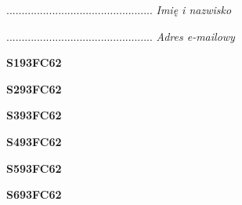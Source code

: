 \begin{turn}{90}\begin{minipage}{\linewidth} \vspace{20mm} ................................................  \textit{Imię i nazwisko}\end{minipage}\end{turn}

\begin{turn}{90}\begin{minipage}{\linewidth} \vspace{20mm} ................................................  \textit{Adres e-mailowy}\end{minipage}\end{turn}

\begin{turn}{90}\huge \begin{minipage}{\linewidth} \vspace{10mm}\textbf{S193FC62}\end{minipage}\end{turn}

\begin{turn}{90}\huge \begin{minipage}{\linewidth} \vspace{10mm}\textbf{S293FC62}\end{minipage}\end{turn}

\begin{turn}{90}\huge \begin{minipage}{\linewidth} \vspace{10mm}\textbf{S393FC62}\end{minipage}\end{turn}

\begin{turn}{90}\huge \begin{minipage}{\linewidth} \vspace{10mm}\textbf{S493FC62}\end{minipage}\end{turn}

\begin{turn}{90}\huge \begin{minipage}{\linewidth} \vspace{10mm}\textbf{S593FC62}\end{minipage}\end{turn}

\begin{turn}{90}\huge \begin{minipage}{\linewidth} \vspace{10mm}\textbf{S693FC62}\end{minipage}\end{turn}

